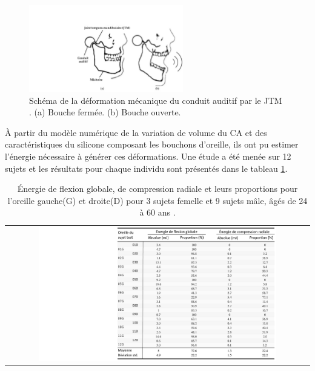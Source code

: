 \begin{figure}[!htbp]
	\begin{center}
		\captionsetup{justification=centering}
		\includegraphics[trim={10.5cm 0cm 0cm 4cm},clip, width=0.6\textwidth]{../Chap1/Figure/schema_JTM.pdf}
		\caption{Schéma de la déformation mécanique du conduit auditif par le JTM \cite{Delnavaz2014}. (a) Bouche fermée. (b) Bouche ouverte.}
		\label{fig:schema_JTM}
	\end{center}
\end{figure}
%

À partir du modèle numérique de la variation de volume du CA et des \mbox{caractéristiques} du silicone composant les bouchons d'oreille, ils ont pu estimer l'énergie nécessaire à générer ces déformations. Une étude a été menée sur 12 sujets et les résultats pour chaque individu sont présentés dans le tableau \ref{tab:earcanal_energie_estimation_subjects}.
\begin{table}[!htb]
\centering
\begin{tabular}{c}
\includegraphics[trim={11cm 0cm 0cm 0cm},clip, width=0.8\textwidth]{../Chap2/Figure/earcanal_energie_estimation_subjects.pdf}
\end{tabular}
\caption{Énergie de flexion globale, de compression radiale et leurs proportions pour l'oreille gauche(G) et droite(D) pour 3 sujets femelle et 9 sujets mâle, âgés de 24 à 60 ans \cite{Carioli2016}.}
\label{tab:earcanal_energie_estimation_subjects}
\end{table} 

